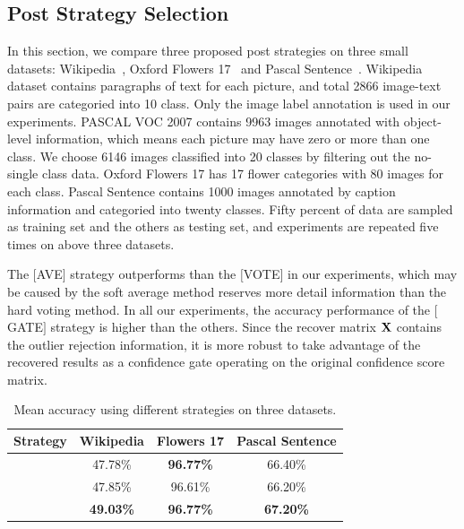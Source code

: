 \documentclass[10pt,twocolumn,letterpaper]{article}
\def\bX{{\bf X}}
\def\bX{{\bf X}}
\begin{document}
\subsection{Post Strategy Selection}

In this section, we compare three proposed post strategies on three small datasets: Wikipedia~\cite{rasiwasia2010new}, Oxford Flowers 17~\cite{nilsback2006visual} and Pascal Sentence~\cite{Li2006One}.
Wikipedia dataset contains paragraphs of text for each picture, and total 2866 image-text pairs are categoried into 10 class.
Only the image label annotation is used in our experiments.
PASCAL VOC 2007 contains 9963 images annotated with object-level information, which means each picture may have zero or more than one class.
We choose 6146 images classified into 20 classes by filtering out the no-single class data.
Oxford Flowers 17 has 17 flower categories with 80 images for each class.
Pascal Sentence contains 1000 images annotated by caption information and categoried into twenty classes.
Fifty percent of data are sampled as training set and the others as testing set, and experiments are repeated five times on above three datasets.

The $[$AVE$]$ strategy outperforms than the $[$VOTE$]$ in our experiments, which may be caused by the soft average method reserves more detail information than the hard voting method.
In all our experiments, the accuracy performance of the $[$GATE$]$ strategy is higher than the others.
Since the recover matrix $\bX$ contains the outlier rejection information,
it is more robust to take advantage of the recovered results as a confidence gate operating on the original confidence score matrix.

\begin{table}[ht]
\centering
\begin{tabular}{c|c|c|c}
\hline
Strategy            & Wikipedia         & Flowers 17          & Pascal Sentence     \\\hline
[AVE]               & 47.78\%           & \textbf{96.77\%}    & 66.40\%             \\\hline
[VOTE]              & 47.85\%           & 96.61\%             & 66.20\%             \\\hline
[GATE]              & \textbf{49.03\%}  & \textbf{96.77\%}    & \textbf{67.20\%}    \\
\hline
\end{tabular}
\caption{Mean accuracy using different strategies on three datasets.}
\label{table:strategy}
\end{table}
\end{document}
